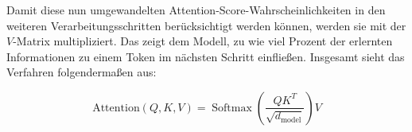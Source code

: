Damit diese nun umgewandelten Attention-Score-Wahrscheinlichkeiten in den weiteren Verarbeitungsschritten berücksichtigt werden können, werden sie mit der \( V \)-Matrix multipliziert. 
Das zeigt dem Modell, zu wie viel Prozent der erlernten Informationen zu einem Token im nächsten Schritt einfließen.
Insgesamt sieht das Verfahren folgendermaßen aus:

\[
\text{Attention}(Q, K, V) = \operatorname{Softmax}\left(\frac{QK^T}{\sqrt{d_{\text{model}}}}\right) V
\]



